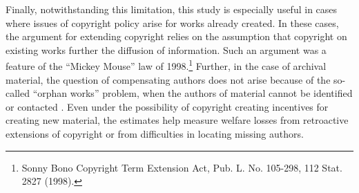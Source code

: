\documentclass[11pt]{article}
\begin{document}
Finally, notwithstanding this limitation, this study is especially useful in cases where issues of copyright policy arise for works already created. In these cases, the argument for extending copyright relies on the assumption that copyright on existing works further the diffusion of information. Such an argument was a feature of the ``Mickey Mouse'' law of 1998.\footnote{Sonny Bono Copyright Term Extension Act, Pub. L. No. 105-298, 112 Stat. 2827 (1998).} Further, in the case of archival material, the question of compensating authors does not arise because of the so-called ``orphan works'' problem, when the authors of material cannot be identified or contacted \citep{smith_analysis_2012}. Even under the possibility of copyright creating incentives for creating new material, the estimates help measure welfare losses from retroactive extensions of copyright or from difficulties in locating missing authors. 

\baselineskip 14.2pt




\end{document}
